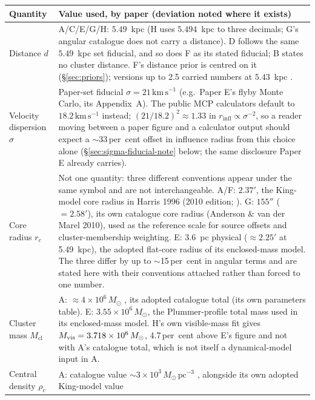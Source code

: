 \documentclass[11pt]{article}
\newcommand{\msun}{\ensuremath{M_\odot}}
\begin{document}
\begin{table}[htbp]
\centering
\small
\begin{tabular}{p{2.1cm}p{9.6cm}}
\toprule
Quantity & Value used, by paper (deviation noted where it exists) \\
\midrule
Distance $d$ &
A/C/E/G/H: $5.49$~kpc \citep{Haberle2025oMEGACatVI} (H uses $5.494$~kpc to three
decimals; G's angular catalogue does not carry a distance). D follows the same
$5.49$~kpc set fiducial, and so does F as its stated fiducial; B states no cluster
distance. F's distance prior is
centred on it (\S\ref{sec:priors}); versions up to 2.5 carried numbers at $5.43$~kpc
\citep{BaumgardtVasiliev2021}. \\
\midrule
Velocity dispersion $\sigma$ &
Paper-set fiducial $\sigma = 21\,\mathrm{km\,s^{-1}}$ (e.g.\ Paper E's flyby
Monte Carlo, its Appendix~A). The public MCP calculators default to
$18.2\,\mathrm{km\,s^{-1}}$ instead; $(21/18.2)^{2} \approx 1.33$ in
$r_{\mathrm{infl}} \propto \sigma^{-2}$, so a reader moving between a paper
figure and a calculator output should expect a $\sim$33\,per~cent offset in
influence radius from this choice alone (\S\ref{sec:sigma-fiducial-note}
below; the same disclosure Paper E already carries). \\
\midrule
Core radius $r_c$ &
Not one quantity: three different conventions appear under the same symbol
and are not interchangeable. A/F: $2.37'$, the King-model core radius in
Harris 1996 (2010 edition; \citealp{Harris2010}). G: $155''$ ($=2.58'$),
its own catalogue core radius (Anderson \& van der Marel 2010), used as the
reference scale for source
offsets and cluster-membership weighting. E: $3.6$~pc physical
($\approx 2.25'$ at 5.49~kpc), the adopted flat-core radius of its
enclosed-mass model. The three differ by up to $\sim$15\,per~cent in angular
terms and are stated here with their conventions attached rather than forced
to one number. \\
\midrule
Cluster mass $M_{\mathrm{cl}}$ &
A: $\approx 4\times10^{6}\,\msun$ \citep{Harris1996,BaumgardtVasiliev2021},
its adopted catalogue total (its own parameters table). E: $3.55\times10^{6}\,\msun$,
the Plummer-profile total mass used in its enclosed-mass model. H's own visible-mass fit gives $M_{\rm vis} =
3.718\times10^{6}\,\msun$, 4.7\,per~cent above E's figure and not
with A's catalogue total, which is not itself a dynamical-model input in A. \\
\midrule
Central density $\rho_c$ &
A: catalogue value $\sim 3\times10^{3}\,\msun\,\mathrm{pc}^{-3}$
\citep{BaumgardtVasiliev2021}, alongside its own adopted King-model value

\end{tabular}
\end{table}
\end{document}
